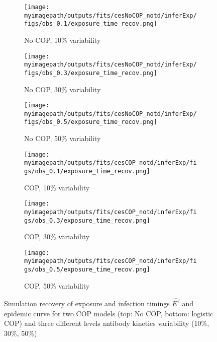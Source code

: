 \begin{figure}[H]

    \centering
    \begin{subfigure}{0.31\textwidth}
        \centering
        \texttt{[image: \\myimagepath/outputs/fits/cesNoCOP\_notd/inferExp/figs/obs\_0.1/exposure\_time\_recov.png]}
        \caption{No COP, 10\% variability \label{fit1:inf}}
    \end{subfigure}
    \begin{subfigure}{0.31\textwidth}
        \centering
        \texttt{[image: \\myimagepath/outputs/fits/cesNoCOP\_notd/inferExp/figs/obs\_0.3/exposure\_time\_recov.png]}
        \caption{No COP, 30\% variability}
    \end{subfigure}
    \begin{subfigure}{0.31\textwidth}
        \centering
        \texttt{[image: \\myimagepath/outputs/fits/cesNoCOP\_notd/inferExp/figs/obs\_0.5/exposure\_time\_recov.png]}
        \caption{No COP, 50\% variability}
    \end{subfigure}
    
  \begin{subfigure}{0.31\textwidth}
        \centering
        \texttt{[image: \\myimagepath/outputs/fits/cesCOP\_notd/inferExp/figs/obs\_0.1/exposure\_time\_recov.png]}
        \caption{ COP, 10\% variability}
    \end{subfigure}
    \begin{subfigure}{0.31\textwidth}
        \centering
        \texttt{[image: \\myimagepath/outputs/fits/cesCOP\_notd/inferExp/figs/obs\_0.3/exposure\_time\_recov.png]}
        \caption{ COP, 30\% variability}
    \end{subfigure}
    \begin{subfigure}{0.31\textwidth}
        \centering
        \texttt{[image: \\myimagepath/outputs/fits/cesCOP\_notd/inferExp/figs/obs\_0.5/exposure\_time\_recov.png]}
        \caption{ COP, 50\% variability}
    \end{subfigure}
    
    \caption{Simulation recovery of exposure and infection timings $\hat{E^\tau}$ and epidemic curve for two COP models (top: No COP, bottom: logistic COP) and three different levels antibody kinetics variability (10\%, 30\%, 50\%) \label{fit2:exp_time}}
\end{figure}


